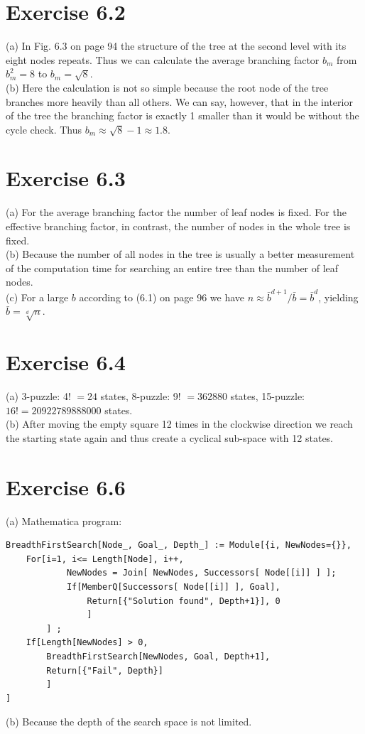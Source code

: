 \documentclass[10pt]{book}
\begin{document}
\section{Exercise 6.2}
(a) In Fig. 6.3 on page 94 the structure of the tree at the second level with its eight nodes repeats. Thus we can calculate the average branching factor $b_{m}$ from $b_{m}^{2}=8$ to $b_{m}=\sqrt{8}$.\\
(b) Here the calculation is not so simple because the root node of the tree branches more heavily than all others. We can say, however, that in the interior of the tree the branching factor is exactly 1 smaller than it would be without the cycle check. Thus $b_{m} \approx \sqrt{8}-1 \approx 1.8$.

\section{Exercise 6.3}
(a) For the average branching factor the number of leaf nodes is fixed. For the effective branching factor, in contrast, the number of nodes in the whole tree is fixed.\\
(b) Because the number of all nodes in the tree is usually a better measurement of the computation time for searching an entire tree than the number of leaf nodes.\\
(c) For a large $b$ according to (6.1) on page 96 we have $n \approx \bar{b}^{d+1} / \bar{b}=\bar{b}^{d}$, yielding $\bar{b}=\sqrt[d]{n}$.

\section{Exercise 6.4}
(a) 3-puzzle: 4! $=24$ states, 8-puzzle: 9! $=362880$ states, 15-puzzle: $16!=20922789888000$ states.\\
(b) After moving the empty square 12 times in the clockwise direction we reach the starting state again and thus create a cyclical sub-space with 12 states.

\section{Exercise 6.6}
(a) Mathematica program:
\begin{verbatim}
BreadthFirstSearch[Node_, Goal_, Depth_] := Module[{i, NewNodes={}},
    For[i=1, i<= Length[Node], i++,
            NewNodes = Join[ NewNodes, Successors[ Node[[i]] ] ];
            If[MemberQ[Successors[ Node[[i]] ], Goal],
                Return[{"Solution found", Depth+1}], 0
                ]
        ] ;
    If[Length[NewNodes] > 0,
        BreadthFirstSearch[NewNodes, Goal, Depth+1],
        Return[{"Fail", Depth}]
        ]
]
\end{verbatim}
(b) Because the depth of the search space is not limited.
\end{document}

